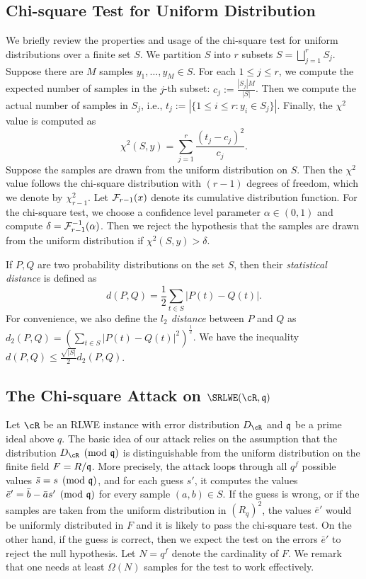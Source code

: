 \documentclass[envcountsame]{llncs}
\begin{document}
\subsection{Chi-square Test for Uniform Distribution}
We briefly review the properties and usage of the chi-square test for uniform distributions over a finite set $S$. We partition $S$ into $r$ subsets $S = \bigsqcup_{j=1}^r S_j$.
Suppose there are $M$ samples $y_1, \ldots, y_M \in S$.
For each $1 \leq j \leq r$, we compute the expected number of samples in the $j$-th subset: $c_j := \frac{|S_j|M}{|S|}$. Then we compute the actual number of samples in $S_j$, i.e., $t_j := |\{1 \leq i \leq r: y_i \in S_j\}|$. Finally, the $\chi^2$ value is computed as
\[
    \chi^2(S,y) = \sum_{j = 1}^r \frac{(t_j -c_j)^2}{c_j}.
\]
Suppose the samples are drawn from the uniform distribution on $S$. Then the $\chi^2$ value follows the chi-square distribution with $(r-1)$ degrees of freedom, which we denote by $\chi_{r-1}^2$. Let $\mathcal{F}_{r-1}(x)$ denote its cumulative distribution function. For the chi-square test, we choose a confidence level parameter $\alpha \in (0,1)$ and compute $\delta = \mathcal{F}_{r-1}^{-1}(\alpha)$. Then we reject the hypothesis that the samples are drawn from the uniform distribution if $\chi^2(S,y)  > \delta$.

If $P,Q$ are two probability distributions on the set $S$, then their {\it statistical distance} is defined as
\[
    d(P,Q) = \frac{1}{2} \sum_{t \in S} |P(t) - Q(t)|.
\]
For convenience, we also define the {\it $l_2$ distance} between $P$ and $Q$ as $d_2(P,Q) = (\sum_{t \in S} |P(t) - Q(t)|^2)^{\frac{1}{2}}$. We have the inequality $d(P,Q) \leq \frac{\sqrt{|S|}}{2}d_2(P,Q)$.


\subsection{The Chi-square Attack on $\SRLWE(\cR,\fq)$}

Let $\cR$ be an RLWE instance with error distribution $D_{\cR}$ and $\mathfrak{q}$ be a prime ideal above $q$.  The basic idea of our attack relies on the assumption that the distribution $D_\cR \pmod {\fq}$ is distinguishable from the uniform distribution on the finite field $F = R/\mathfrak{q}$. More precisely, the attack loops through all $q^f$ possible values $\bar{s} = s \pmod{\mathfrak{q}}$, and for each guess $s'$, it computes the values $\bar{e}' = \bar{b} - \bar{a} s' \pmod {\mathfrak{q}}$ for every sample $(a,b) \in S$. If the guess is wrong, or if the samples are taken from the uniform distribution in $(R_q)^2$, the values $\bar{e}'$ would be uniformly distributed in $F$ and it is likely to pass the chi-square test. On the other hand, if the guess is correct, then we expect the test on the errors $\bar{e}'$ to reject the null hypothesis. Let $N = q^f$ denote the cardinality of $F$. We remark that one needs at least $\Omega(N)$ samples for the test to work effectively.
\end{document}
